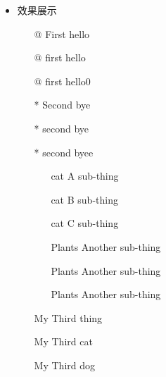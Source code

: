\documentclass[UTF8]{ctexart}
\begin{document}
\begin{enumerate}
\begin{itemize}
\begin{lstlisting}
\begin{itemize}
   \item[@] First hello
   \item[@] first hello
   \item[@] first hello0
   \item[*] Second bye
   \item[*] second bye
   \item[*] second byee
    \begin{itemize}
   \item[cat] A sub-thing
   \item[cat] B sub-thing
   \item[cat] C sub-thing
   \item[Plants] Another sub-thing
   \item[Plants] Another sub-thing
   \item[Plants] Another sub-thing
    \end{itemize}
   \item[My] Third thing
   \item[My] Third cat
   \item[My] Third dog
\end{itemize}

\end{lstlisting}

      \item 效果展示
\begin{itemize}
   \item[@] First hello
   \item[@] first hello
   \item[@] first hello0
   \item[*] Second bye
   \item[*] second bye
   \item[*] second byee
    \begin{itemize}
   \item[cat] A sub-thing
   \item[cat] B sub-thing
   \item[cat] C sub-thing
   \item[Plants] Another sub-thing
   \item[Plants] Another sub-thing
   \item[Plants] Another sub-thing
    \end{itemize}
   \item[My] Third thing
   \item[My] Third cat
   \item[My] Third dog
\end{itemize}

\end{itemize}
\end{enumerate}
\end{document}
